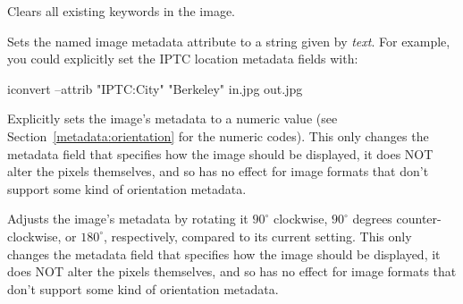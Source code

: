 Clears all existing keywords in the image.
\apiend

Sets the named image metadata attribute to a string given by
\emph{text}.  For example, you could explicitly set the IPTC location
metadata fields with:

\begin{code}
        iconvert --attrib "IPTC:City" "Berkeley" in.jpg out.jpg
\end{code}
\apiend

Explicitly sets the image's  metadata to a numeric
value (see Section~\ref{metadata:orientation} for the numeric codes).
This only changes the metadata field that specifies
how the image should be displayed, it does NOT alter the pixels
themselves, and so has no effect for image formats that don't
support some kind of orientation metadata.
\apiend

Adjusts the image's  metadata by rotating it $90^\circ$
clockwise, $90^\circ$ degrees counter-clockwise, or $180^\circ$,
respectively, compared to its current setting.  This only changes the
metadata field that specifies how the image should be displayed, it does
NOT alter the pixels themselves, and so has no effect for image formats
that don't support some kind of orientation metadata.
\apiend

